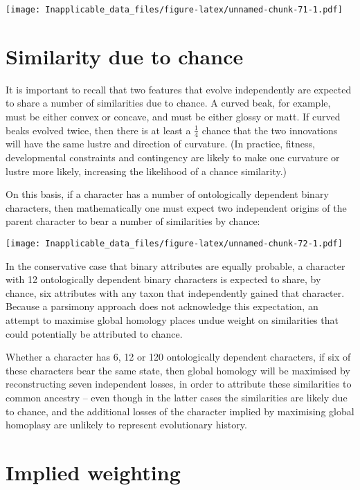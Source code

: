 \documentclass[]{book}
\theoremstyle{definition}
\theoremstyle{definition}
\theoremstyle{definition}
\theoremstyle{remark}
\begin{document}
\texttt{[image: Inapplicable\_data\_files/figure-latex/unnamed-chunk-71-1.pdf]}

\section{Similarity due to chance}\label{similarity-due-to-chance}

It is important to recall that two features that evolve independently
are expected to share a number of similarities due to chance. A curved
beak, for example, must be either convex or concave, and must be either
glossy or matt. If curved beaks evolved twice, then there is at least a
\(\frac{1}{4}\) chance that the two innovations will have the same
lustre and direction of curvature. (In practice, fitness, developmental
constraints and contingency are likely to make one curvature or lustre
more likely, increasing the likelihood of a chance similarity.)

On this basis, if a character has a number of ontologically dependent
binary characters, then mathematically one must expect two independent
origins of the parent character to bear a number of similarities by
chance:

\texttt{[image: Inapplicable\_data\_files/figure-latex/unnamed-chunk-72-1.pdf]}

In the conservative case that binary attributes are equally probable, a
character with 12 ontologically dependent binary characters is expected
to share, by chance, six attributes with any taxon that independently
gained that character. Because a parsimony approach does not acknowledge
this expectation, an attempt to maximise global homology places undue
weight on similarities that could potentially be attributed to chance.

Whether a character has 6, 12 or 120 ontologically dependent characters,
if six of these characters bear the same state, then global homology
will be maximised by reconstructing seven independent losses, in order
to attribute these similarities to common ancestry -- even though in the
latter cases the similarities are likely due to chance, and the
additional losses of the character implied by maximising global
homoplasy are unlikely to represent evolutionary history.

\section{Implied weighting}\label{implied-weighting}
\end{document}
